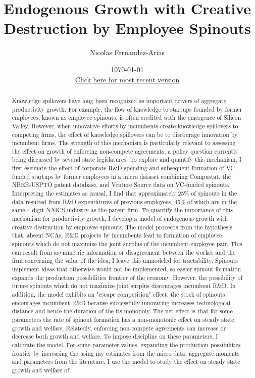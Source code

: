 \documentclass[12pt,english]{article}
\theoremstyle{remark}
\begin{document}
	
\title{Endogenous Growth with Creative Destruction by Employee Spinouts}
\author{Nicolas Fernandez-Arias}
\date{\today \\ \small
	\href{https://drive.google.com/open?id=1NZCBFnkxug8qXWAZLTir6dEmIy9LuEBg}{Click here for most recent version}}
\maketitle



\begin{abstract}
	Knowledge spillovers have long been recognized as important drivers of aggregate productivity growth. For example, the flow of knowledge to startups founded by former employees, known as employee spinouts, is often credited with the emergence of Silicon Valley. However, when innovative efforts by incumbents create knowledge spillovers to competing firms, the effect of knowledge spillovers can be to discourage innovation by incumbent firms. The strength of this mechanism is particularly relevant to assessing the effect on growth of enforcing non-compete agreements, a policy question currently being discussed by several state legislatures. To explore and quantify this mechanism, I first esitmate the effect of corporate R\&D spending and subsequent formation of VC-funded startups by former employees in a micro dataset combining Compustat, the NBER-USPTO patent database, and Venture Source data on VC-funded spinouts. Interpreting the estimates as causal, I find that approximately 25\% of spinouts in the data resulted from R\&D expenditures of previous employees, 45\% of which are in the same 4-digit NAICS industry as the parent firm. To quantify the importance of this mechanism for productivity growth, I develop a model of endogenous growth with creative destruction by employee spinouts. The model proceeds from the hypothesis that, absent NCAs, R\&D projects by incumbents lead to formation of employee spinouts which do not maximize the joint surplus of the incumbent-employee pair. This can result from asymmetric information or disagreement between the worker and the firm concerning the value of the idea; I leave this unmodeled for tractability. Spinouts implement ideas that otherwise would not be implemented, so easier spinout formation expands the production possibilities frontier of the economy. However, the possibility of future spinouts which do not maximize joint surplus discourages incumbent R\&D. In addition, the model exhibits an "escape competition" effect: the stock of spinouts encourages incumbent R\&D because successfully innovating increases technological distance and hence the duration of the its monopoly. The net effect is that for some parameters the rate of spinout formation has a non-monotonic effect on steady state growth and welfare. Relatedly, enforcing non-compete agreements can increase or decrease both growth and welfare. To impose discipline on these parameters, I calibrate the model. For some parameter values, expanding the production possibilities frontier by increasing the using my estimates from the micro data, aggregate moments and parameters from the literature. I use the model to study the effect on steady state growth and welfare of 
\end{abstract}
\end{document}
